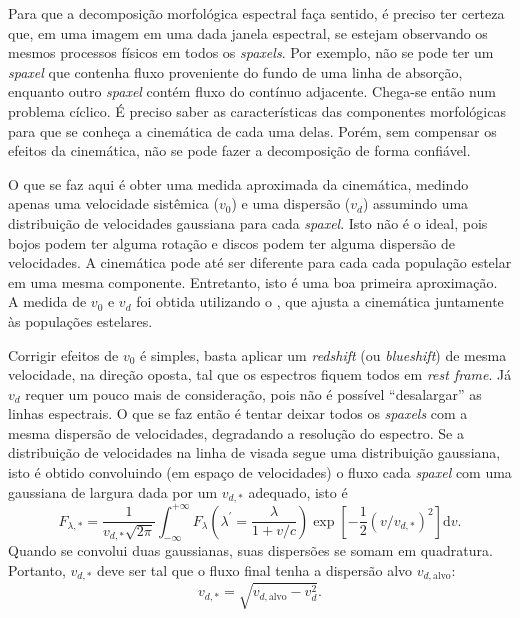 Para que a decomposição morfológica espectral faça sentido, é preciso ter
certeza que, em uma imagem em uma dada janela espectral, se estejam observando
os mesmos processos físicos em todos os {\em spaxels}. Por exemplo, não se pode
ter um {\em spaxel} que contenha fluxo proveniente do fundo de uma linha de
absorção, enquanto outro {\em spaxel} contém fluxo do contínuo adjacente.
Chega-se então num problema cíclico. É preciso saber as características das
componentes morfológicas para que se conheça a cinemática de cada uma delas.
Porém, sem compensar os efeitos da cinemática, não se pode fazer a decomposição
de forma confiável.

O que se faz aqui é obter uma medida aproximada da cinemática, medindo apenas
uma velocidade sistêmica ($v_0$) e uma dispersão ($v_d$) assumindo uma
distribuição de velocidades gaussiana para cada {\em spaxel}. Isto não é o
ideal, pois bojos podem ter alguma rotação e discos podem ter alguma dispersão
de velocidades. A cinemática pode até ser diferente para cada cada população
estelar em uma mesma componente. Entretanto, isto é uma boa primeira
aproximação. A medida de $v_0$ e $v_d$ foi obtida utilizando o \starlight, que
ajusta a cinemática juntamente às populações estelares.

Corrigir efeitos de $v_0$ é simples, basta aplicar um {\em redshift} (ou {\em
blueshift}) de mesma velocidade, na direção oposta, tal que os espectros fiquem
todos em {\em rest frame}. Já $v_d$ requer um pouco mais de consideração, pois
não é possível ``desalargar'' as linhas espectrais. O que se faz então é tentar
deixar todos os {\em spaxels} com a mesma dispersão de velocidades, degradando a
resolução do espectro. Se a distribuição de velocidades na linha de visada segue
uma distribuição gaussiana, isto é obtido convoluindo (em espaço de velocidades)
o fluxo cada {\em spaxel} com uma gaussiana de largura dada por um $v_{d,\ast}$
adequado, isto é
\begin{equation*}
F_{\lambda,\ast} = \frac{1}{v_{d,\ast}\sqrt{2\pi}}\int_{-\infty}^{+\infty}
F_\lambda \left(\lambda^\prime = \frac{\lambda}{1 + v/c}\right) \exp \left[ -\frac{1}{2}
(v/v_{d,\ast})^2 \right] \mathrm{d}v.
\end{equation*}
Quando se convolui duas gaussianas, suas dispersões se somam em
quadratura. Portanto, $v_{d,\ast}$ deve ser tal que o fluxo final tenha a
dispersão alvo $v_{d,\mathrm{alvo}}$:
\begin{equation*}
v_{d,\ast} = \sqrt{v_{d,\mathrm{alvo}} - v^2_d}.
\end{equation*}

